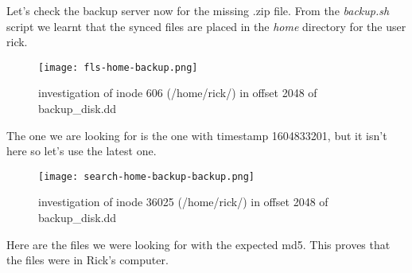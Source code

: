 Let's check the backup server now for the missing .zip file. From the \textit{backup.sh} script we learnt that the synced files are placed in the \textit{home} directory for the user rick.

\begin{figure}[H]
    \texttt{[image: fls-home-backup.png]}
    \centering
    \caption{investigation of inode 606 (/home/rick/) in offset 2048 of backup\_disk.dd}
\end{figure}

The one we are looking for is the one with timestamp 1604833201, but it isn't here so let's use the latest one.

\begin{figure}[H]
    \texttt{[image: search-home-backup-backup.png]}
    \centering
    \caption{investigation of inode 36025 (/home/rick/) in offset 2048 of backup\_disk.dd}
\end{figure}

Here are the files we were looking for with the expected md5. This proves that the files were in Rick's computer. 
